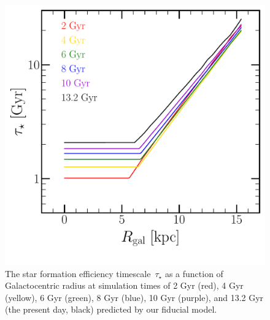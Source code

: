 \documentclass[draft2.tex]{subfiles}
\begin{document}
\begin{figure} 
\centering 
\includegraphics[scale = 0.45]{sfe.pdf} 
\caption{The star formation efficiency timescale~$\tau_\star$ as a function of 
Galactocentric radius at simulation times of 2 Gyr (red), 4 Gyr (yellow), 
6 Gyr (green), 8 Gyr (blue), 10 Gyr (purple), and 13.2 Gyr (the present day, 
black) predicted by our fiducial model. } 
\label{fig:sfe} 
\end{figure} 
\end{document}
